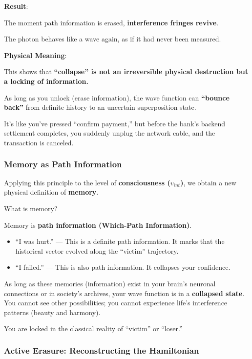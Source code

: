 \textbf{Result}:

The moment path information is erased, \textbf{interference fringes revive}.

The photon behaves like a wave again, as if it had never been measured.

\textbf{Physical Meaning}:

This shows that \textbf{``collapse'' is not an irreversible physical destruction but a locking of information.}

As long as you unlock (erase information), the wave function can \textbf{``bounce back''} from definite history to an uncertain superposition state.

It's like you've pressed ``confirm payment,'' but before the bank's backend settlement completes, you suddenly unplug the network cable, and the transaction is canceled.

\subsubsection{Memory as Path Information}

Applying this principle to the level of \textbf{consciousness ($v_{int}$)}, we obtain a new physical definition of \textbf{memory}.

What is memory?

Memory is \textbf{path information (Which-Path Information)}.

\begin{itemize}
\item ``I was hurt.'' --- This is a definite path information. It marks that the historical vector evolved along the ``victim'' trajectory.

\item ``I failed.'' --- This is also path information. It collapses your confidence.
\end{itemize}

As long as these memories (information) exist in your brain's neuronal connections or in society's archives, your wave function is in a \textbf{collapsed state}. You cannot see other possibilities; you cannot experience life's interference patterns (beauty and harmony).

You are locked in the classical reality of ``victim'' or ``loser.''

\subsubsection{Active Erasure: Reconstructing the Hamiltonian}

